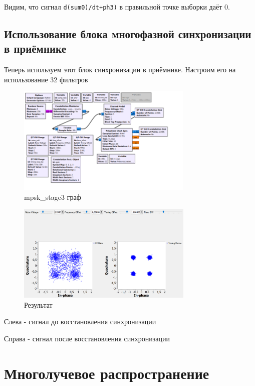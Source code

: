 \documentclass[a4paper,12pt]{article}
\begin{document}
	Видим, что сигнал \texttt{d(sum0)/dt+ph3)} в правильной точке выборки даёт 0.
	
	\subsection{Использование блока многофазной синхронизации в приёмнике}
	
	Теперь используем этот блок синхронизации в приёмнике. Настроим его на использование 32 фильтров
	
	\begin{figure}[H]
		\centering
		\includegraphics[width=0.75\textwidth]{3_10.png}
		\caption{mpsk\_stage3 граф}
		\label{fig:3.10}
	\end{figure}
	
	\begin{figure}[H]
		\centering
		\includegraphics[width=0.75\textwidth]{3_11.png}
		\caption{Результат}
		\label{fig:3.11}
	\end{figure}
	
	Слева - сигнал до восстановления синхронизации
	
	Справа - сигнал после восстановления синхронизации
	
	\newpage
	
	\section{Многолучевое распространение}
	
\end{document}
